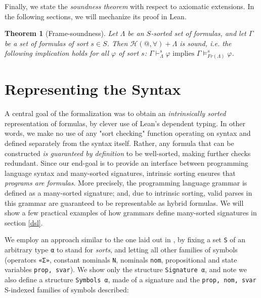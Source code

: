 \documentclass{easychair}
\newtheorem{theorem}{Theorem}
\theoremstyle{remark}
\begin{document}

Finally, we state the  \textit{soundness theorem} with respect to axiomatic extensions. In the following sections, we will mechanize its proof in Lean.

\begin{theorem}[Frame-soundness]\label{thsound}
    Let $\Lambda$ be an $S$-sorted set of formulas, and let $\Gamma$ be a set of formulas of sort $s \in S$. 
    Then $\mathcal{H}(@, \forall) + \Lambda$ is \textit{sound}, i.e. the following implication holds  
    for all $\varphi$ of sort $s$: $\Gamma \vdash^s_{\Lambda} \varphi \text{ implies } \Gamma \vDash^s_{Fr(\Lambda)} \varphi$.
\end{theorem}



\section{Representing the Syntax}\label{syntax}

A central goal of the formalization was to obtain an \textit{intrinsically sorted} representation of formulas, by clever use of Lean's dependent typing. In other words, we make no use of any "sort checking" function operating on syntax and defined separately from the syntax itself. Rather, any formula that can be constructed \textit{is guaranteed by definition} to be well-sorted, making further checks redundant. Since our end-goal is to provide an interface between programming language syntax and many-sorted signatures, intrinsic sorting ensures that \textit{programs are formulas}. More precisely, the programming language grammar is defined as a many-sorted signature; and, due to intrinsic sorting, valid parses in this grammar are guaranteed to be representable as hybrid formulas. We will show a few practical examples of how grammars define many-sorted signatures in section \ref{dsl}.

We employ an approach similar to the one laid out in \cite{gunther2018formalization}, by fixing a set \lstinline{S} of an arbitrary type \lstinline{α} to stand for \textit{sorts}, and letting all other families of symbols (operators \lstinline{«Σ»}, constant nominals \lstinline{N}, nominals \lstinline{nom}, propositional and state variables \lstinline{prop, svar}). We show only the structure \lstinline{Signature α}, and note we also define a structure \lstinline{Symbols α}, made of a signature and the \lstinline{prop, nom, svar} S-indexed families of symbols described:
\end{document}
